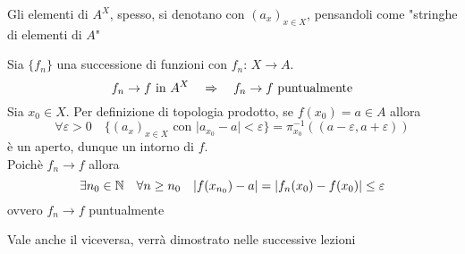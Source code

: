 \begin{oss}Gli elementi di $A^X$, spesso, si denotano con $(a_x)_{x\in X}$, pensandoli come "stringhe di elementi di $A$"
\end{oss}
\begin{lem}Sia $\{f_n\}$ una successione di funzioni con $f_n:\, X \to A $.
$$f_n \to f \text{ in } A^X \quad \Rightarrow \quad f_n \to f \text{ puntualmente} $$
\proof Sia $x_0 \in X $. Per definizione di topologia prodotto, se $f(x_0)=a \in A$ allora
$$\forall \varepsilon>0 \quad  \{ (a_x)_{x\in X }\text{ con } \vert a_{x_0} -a \vert < \varepsilon \} = \pi_{x_0}^{-1}((a-\varepsilon, a+\varepsilon))$$ 
\`e un aperto, dunque un intorno di $f$.\\
Poich\`e $f_n \to f $ allora
$$ \exists n_0 \in \mathbb{N} \quad \forall n \geq n_0  \quad \vert f(x_{n_0}) - a\vert = \vert f_n(x_0) - f(x_0) \vert \leq \varepsilon $$ 
ovvero $f_n \to f $ puntualmente 
\endproof
\begin{oss}Vale anche il viceversa, verr\`a dimostrato nelle successive lezioni
\end{oss}
\end{lem}
